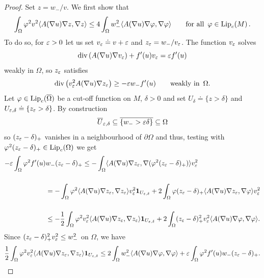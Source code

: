 \documentclass[10 pt,a4paper]{article}
\theoremstyle{definition}
\begin{document}
\begin{proof}
%
Set $z = w_-/v$. We first show that
	\begin{equation} \label{A-L1}
		\int_\Omega \varphi^2 v^2 \langle A(\nabla u) \nabla z, \nabla z \rangle \leq 4 \int_\Omega w_-^2 \langle A(\nabla u)\nabla\varphi,\nabla\varphi \rangle %
		\qquad \text{for all } \, \varphi \in \lip_c(M) \, .
	\end{equation}
	To do so, for $\varepsilon>0$ let us set $v_\varepsilon \doteq v+\varepsilon$ and $z_\varepsilon = w_-/v_\varepsilon$. The function $v_\varepsilon$ solves
	\[
	\mathrm{div} \left( A(\nabla u)\nabla v_\varepsilon\right) + f'(u)v_\varepsilon = \varepsilon f'(u)
	\]
	weakly in  $\Omega$, so $z_\varepsilon$ satisfies
	\begin{equation} \label{veps_weak}
		\mathrm{div} \left( v_\varepsilon^2 A(\nabla u)\nabla z_\varepsilon \right) \ge -\varepsilon w_-f'(u) \qquad \text{weakly in } \, \Omega.
	\end{equation}
	Let $\varphi \in \mathrm{Lip}_c(\overline\Omega)$ be a cut-off function on $M$, $\delta>0$ and set $U_\delta \doteq \{z > \delta\}$ and $U_{\varepsilon,\delta} \doteq \{z_\varepsilon > \delta\}$.
	By construction
	\[
	\overline{U}_{\varepsilon,\delta} \subseteq \overline{\{w_- > \varepsilon\delta\}} \subseteq \Omega
	\]
	so $(z_\varepsilon -\delta)_+$ vanishes in a neighbourhood of $\partial \Omega$ and thus, testing with $\varphi^2 (z_\varepsilon -\delta)_+ \in \mathrm{Lip}_c(\Omega)$ we get
	\begin{align*}
		\displaystyle - \varepsilon \int_{\Omega} \varphi^2 f'(u) & w_-(z_\varepsilon -\delta)_+ \le - \displaystyle \int_\Omega \langle A(\nabla u) \nabla z_\varepsilon, \nabla(\varphi^2(z_\varepsilon -\delta)_+) \rangle v_\varepsilon^2\\[0.5cm]
		& = \displaystyle - \int_\Omega \varphi^2 \langle A(\nabla u) \nabla z_\varepsilon, \nabla z_\varepsilon \rangle v_\varepsilon^2 \mathbf{1}_{U_{\varepsilon,\delta}} + 2 \int_\Omega \varphi(z_\varepsilon - \delta)_+ \langle A(\nabla u) \nabla z_\varepsilon, \nabla \varphi \rangle v_\varepsilon^2 \\[0.5cm]
		& \leq \displaystyle - \frac{1}{2} \int_\Omega \varphi^2 v_\varepsilon^2 \langle A(\nabla u) \nabla z_\varepsilon, \nabla z_\varepsilon \rangle \mathbf{1}_{U_{\varepsilon,\delta}} + 2 \int_\Omega (z_\varepsilon - \delta)_+^2v_\varepsilon^2 \langle A(\nabla u) \nabla \varphi, \nabla \varphi \rangle.	    
	\end{align*}
	Since $(z_\varepsilon-\delta)^2_+ v_\varepsilon^2 \le w_-^2$ on $\Omega$, we have	
	\[
	\frac{1}{2} \int_\Omega \varphi^2 v_\varepsilon^2 \langle A(\nabla u) \nabla z_\varepsilon, \nabla z_\varepsilon \rangle \mathbf{1}_{U_{\varepsilon,\delta}} \le 2 \int_\Omega w_-^2 \langle A(\nabla u) \nabla \varphi, \nabla \varphi \rangle + \varepsilon \int_\Omega \varphi^2 f'(u)w_-(z_\varepsilon -\delta)_+ .
\]
\end{proof}
\end{document}
